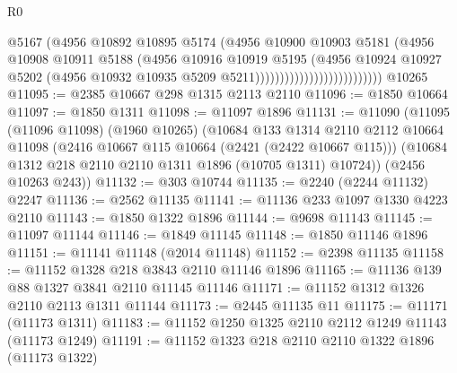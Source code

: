 \begin{lexlean}{R0}
\begin{coremodule}
                                            @5167
                                            (@4956
                                              @10892
                                              @10895
                                              @5174
                                              (@4956
                                                @10900
                                                @10903
                                                @5181
                                                (@4956
                                                  @10908
                                                  @10911
                                                  @5188
                                                  (@4956
                                                    @10916
                                                    @10919
                                                    @5195
                                                    (@4956
                                                      @10924
                                                      @10927
                                                      @5202
                                                      (@4956
                                                        @10932
                                                        @10935
                                                        @5209
                                                        @5211))))))))))))))))))))))))))
    @10265
@11095 := @2385 @10667 @298 @1315 @2113 @2110
@11096 := @1850 @10664
@11097 := @1850 @1311
@11098 := @11097 @1896
@11131 := @11090
    (@11095
      (@11096 @11098)
      (@1960 @10265)
      (@10684
        @133
        @1314
        @2110
        @2112
        @10664
        @11098
        (@2416 @10667 @115 @10664 (@2421 (@2422 @10667 @115)))
        (@10684 @1312 @218 @2110 @2110 @1311 @1896 (@10705 @1311) @10724))
      (@2456 @10263 @243))
@11132 := @303 @10744
@11135 := @2240 (@2244 @11132) @2247
@11136 := @2562 @11135
@11141 := @11136 @233 @1097 @1330 @4223 @2110
@11143 := @1850 @1322 @1896
@11144 := @9698 @11143
@11145 := @11097 @11144
@11146 := @1849 @11145
@11148 := @1850 @11146 @1896
@11151 := @11141 @11148 (@2014 @11148)
@11152 := @2398 @11135
@11158 := @11152 @1328 @218 @3843 @2110 @11146 @1896
@11165 := @11136 @139 @88 @1327 @3841 @2110 @11145 @11146
@11171 := @11152 @1312 @1326 @2110 @2113 @1311 @11144
@11173 := @2445 @11135 @11
@11175 := @11171 (@11173 @1311)
@11183 := @11152 @1250 @1325 @2110 @2112 @1249 @11143 (@11173 @1249)
@11191 := @11152 @1323 @218 @2110 @2110 @1322 @1896 (@11173 @1322)

\end{coremodule}
\end{lexlean}
